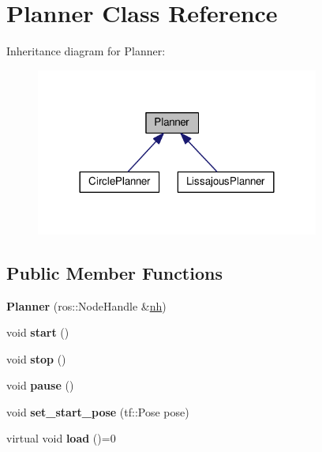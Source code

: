\hypertarget{classPlanner}{}\section{Planner Class Reference}
\label{classPlanner}


Inheritance diagram for Planner\+:\nopagebreak
\begin{figure}[H]
\begin{center}
\leavevmode
\includegraphics[width=264pt]{classPlanner__inherit__graph}
\end{center}
\end{figure}
\subsection*{Public Member Functions}
\begin{DoxyCompactItemize}
\item 
{\bfseries Planner} (ros\+::\+Node\+Handle \&\hyperlink{classPlanner_a9714d036f444a07ce90be8d135b9a40c}{nh})\hypertarget{classPlanner_a32475baddd401921adb1aab3ab842210}{}\label{classPlanner_a32475baddd401921adb1aab3ab842210}

\item 
void {\bfseries start} ()\hypertarget{classPlanner_a6c1c8d67d0cac41f738b413d1833c007}{}\label{classPlanner_a6c1c8d67d0cac41f738b413d1833c007}

\item 
void {\bfseries stop} ()\hypertarget{classPlanner_a3d0a3d404d39f59bfc21f275b0da408a}{}\label{classPlanner_a3d0a3d404d39f59bfc21f275b0da408a}

\item 
void {\bfseries pause} ()\hypertarget{classPlanner_a400f2aefad591e55a62e0fb13cb02521}{}\label{classPlanner_a400f2aefad591e55a62e0fb13cb02521}

\item 
void {\bfseries set\+\_\+start\+\_\+pose} (tf\+::\+Pose pose)\hypertarget{classPlanner_acaf55e0e250d6f3ba14bfcf3c4f06ffb}{}\label{classPlanner_acaf55e0e250d6f3ba14bfcf3c4f06ffb}

\item 
virtual void {\bfseries load} ()=0\hypertarget{classPlanner_af10d045ffe58c7d2149156567dc8b10a}{}\label{classPlanner_af10d045ffe58c7d2149156567dc8b10a}

\end{DoxyCompactItemize}
